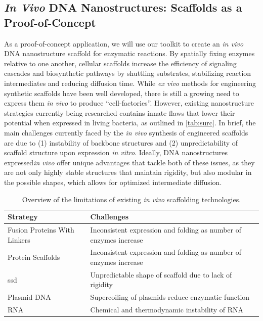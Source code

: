 \documentclass[a4paper]{article}
\begin{document}
\subsection*{\textit{In Vivo} DNA Nanostructures: Scaffolds as a Proof-of-Concept}
As a proof-of-concept application, we will use our toolkit to create an \textit{in vivo} DNA nanostructure scaffold for enzymatic reactions.
By spatially fixing enzymes relative to one another, cellular scaffolds increase the efficiency of signaling cascades and biosynthetic pathways by shuttling substrates, stabilizing reaction intermediates and reducing diffusion time\cite{intro8,intro9}.
While \textit{ex vivo} methods for engineering synthetic scaffolds have been well developed, there is still a growing need to express them \textit{in vivo} to produce “cell-factories”\cite{tab7}.
However, existing nanostructure strategies currently being researched contains innate flaws that lower their potential when expressed in living bacteria, as outlined in \autoref{tab:surc}.
In brief, the main challenges currently faced by the \textit{in vivo} synthesis of engineered scaffolds are due to (1) instability of backbone structures and (2) unpredictability of scaffold structure upon expression \textit{in vitro}.
Ideally, DNA nanostructures expressed\textit{in vivo} offer unique advantages that tackle both of these issues, as they are not only highly stable structures that maintain rigidity, but also modular in the possible shapes, which allows for optimized intermediate diffusion\cite{intro1}.
\begin{table}[h!]
    \centering
    \begin{tabulary}{\linewidth}{l l}
        \bottomrule
        \textbf{Strategy} & \textbf{Challenges} \\
        \midrule
        Fusion Proteins With Linkers & Inconsistent expression and folding as number of enzymes increase\cite{tab1,tab2}\\
        Protein Scaffolds & Inconsistent expression and folding as number of enzymes increase\cite{tab3,tab4,tab5,intro16}\\
        \ac{ssd} & Unpredictable shape of scaffold due to lack of rigidity\cite{tab7,tab8}\\
        Plasmid DNA & Supercoiling of plasmids reduce enzymatic function\cite{tab9,tab10}\\
        RNA & Chemical and thermodynamic instability of RNA\cite{tab11,tab12}\\
        \bottomrule
    \end{tabulary}
    \caption{Overview of the limitations of existing \textit{in vivo} scaffolding technologies.}
    \label{tab:surc}
\end{table}
\end{document}
